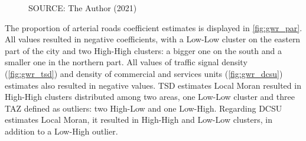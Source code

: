 \begin{figure}[!htbp]
\begin{subfigure}{0.5\textwidth}
    \end{subfigure}    
    \label{fig:gwr_intercept}
    \par SOURCE: The Author (2021)
\end{figure}

The proportion of arterial roads coefficient estimates is displayed in \autoref{fig:gwr_par}. All values resulted in negative coefficients, with a Low-Low cluster on the eastern part of the city and two High-High clusters: a bigger one on the south and a smaller one in the northern part. All values of traffic signal density (\autoref{fig:gwr_tsd}) and density of commercial and services units (\autoref{fig:gwr_dcsu}) estimates also resulted in negative values. TSD estimates Local Moran resulted in High-High clusters distributed among two areas, one Low-Low cluster and three TAZ defined as outliers: two High-Low and one Low-High. Regarding DCSU estimates Local Moran, it resulted in High-High and Low-Low clusters, in addition to a Low-High outlier. 


